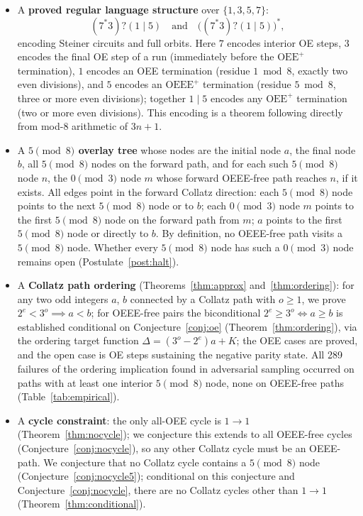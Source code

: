 \documentclass[11pt]{article}
\begin{document}
\begin{itemize}
  \item A \textbf{proved regular language structure} over $\{1,3,5,7\}$:
        \[
          (7^*3)?(1 \mid 5)
          \quad\text{and}\quad
          \bigl((7^*3)?(1\mid 5)\bigr)^*,
        \]
        encoding Steiner circuits and full orbits.  Here $7$ encodes interior
        OE steps, $3$ encodes the final OE step of a run (immediately before
        the $\mathrm{OEE}^+$ termination), $1$ encodes an OEE
        termination (residue $1 \bmod 8$, exactly two even divisions), and
        $5$ encodes an $\mathrm{OEEE}^+$ termination (residue $5 \bmod 8$,
        three or more even divisions); together $1 \mid 5$ encodes any
        $\mathrm{OEE}^+$ termination (two or more even divisions).  This
        encoding is a theorem following directly from mod-8 arithmetic of $3n+1$.

  \item A \textbf{$5\pmod{8}$ overlay tree} whose nodes are the initial node
        $a$, the final node $b$, all $5\pmod{8}$ nodes on the forward path,
        and for each such $5\pmod{8}$ node $n$, the $0\pmod{3}$ node $m$
        whose forward OEEE-free path reaches $n$, if it exists.
        All edges point in the forward Collatz direction: each $5\pmod{8}$
        node points to the next $5\pmod{8}$ node or to $b$; each $0\pmod{3}$
        node $m$ points to the first $5\pmod{8}$ node on the forward path
        from $m$; $a$ points to the first $5\pmod{8}$ node or directly to $b$.
        By definition, no OEEE-free path visits a $5\pmod{8}$ node.
        Whether every $5\pmod{8}$ node has such a $0\pmod{3}$ node
        remains open (Postulate~\ref{post:halt}).

  \item A \textbf{Collatz path ordering} (Theorems~\ref{thm:approx}
        and~\ref{thm:ordering}): for any two odd integers $a$, $b$ connected
        by a Collatz path with $o \geq 1$, we prove $2^e < 3^o \implies a < b$;
        for OEEE-free pairs the biconditional $2^e \geq 3^o \iff a \geq b$
        is established conditional on Conjecture~\ref{conj:oe}
        (Theorem~\ref{thm:ordering}), via the ordering target function
        $\Delta = (3^o-2^e)a+K$; the OEE cases are proved, and the open
        case is OE steps sustaining the negative parity state.
        All 289 failures of the ordering implication found in adversarial sampling
        occurred on paths with at least one interior $5\pmod{8}$ node, none on
        OEEE-free paths (Table~\ref{tab:empirical}).

  \item A \textbf{cycle constraint}: the only all-OEE cycle is $1\to 1$
        (Theorem~\ref{thm:nocycle}); we conjecture this extends to all
        OEEE-free cycles (Conjecture~\ref{conj:nocycle}), so any other
        Collatz cycle must be an
        OEEE-path.  We conjecture that no Collatz cycle contains a
        $5\pmod{8}$ node (Conjecture~\ref{conj:nocycle5}); conditional on
        this conjecture and Conjecture~\ref{conj:nocycle}, there are no
        Collatz cycles other than $1\to 1$ (Theorem~\ref{thm:conditional}).
\end{itemize}
\end{document}
